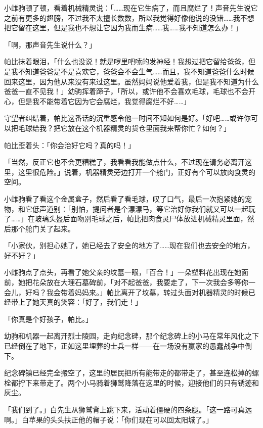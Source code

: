 小雌驹顿了顿，看着机械精灵说：「……现在它生病了，而且腐烂了！声音先生说它之前有更多的翅膀，不过我不太擅长数数，所以我觉得好像他说的没错……我不想把它留在这里，但是我也不想让它因为我而生病……我……我不知道怎么办！」

「啊，那声音先生说什么？」

帕比抹着眼泪，「什么也没说！就是啰里吧嗦的发神经！我想过把它留给爸爸，但是我不知道爸爸是不是喜欢它，爸爸会不会生气……而且，我不知道爸爸什么时候回来这里，因为他从来没有来过这里。虽然妈妈说他爱着我，但是我不知道为什么爸爸一直不见我！」幼驹挥着蹄子，「所以，或许他不会喜欢毛球，毛球也不会开心，但是我不能带着它因为它会腐烂，我觉得腐烂不好……」

守望者纠结着，帕比这番话的沉重感令他一时间不知如何是好。「好吧……或许你可以把毛球给我？把它放在这个机器精灵的货仓里面我来帮你忙？如何？」

帕比歪着头：「你会治好它吗？真的吗！」

「当然，反正它也不会更糟糕了，我看看我能做点什么，不过现在请务必离开这里，这里很危险。」说着，机器精灵旁边打开一个舱门，正好有个可以放肉食灵的空间。

小雌驹看了看这个金属盒子，然后看了看毛球，叹了口气，最后一次抱紧她的宠物，和它低声道别：「别怕，提问者是个漂漂马，等它治好你我们就又可以一起玩了……」在玻璃头盔后面吻别毛球之后，帕比把肉食灵尸体放进机械精灵里面，然后那个舱门关了起来。

「小家伙，别担心她了，她已经去了安全的地方了……现在我们也去安全的地方，好不好？」

小雌驹点了点头，再看了她父亲的坟墓一眼，「百合！」一朵塑料花出现在她面前，她把花朵放在大理石墓碑前，「对不起爸爸，我要走了，下一次我会多等你一会儿，好吗？我会带着妈妈来。」帕比离开了坟墓，转过头面对机器精灵的时候已经带上了她天真的笑容：「好了，我们走！」

「你真是个好孩子，帕比。」

幼驹和机器一起离开烈士陵园，走向纪念碑，那个纪念碑上的小马在常年风化之下已经倒在了地下，正如这里埋葬的士兵一样——在一场没有赢家的愚蠢战争中倒下。

\horizonline


纪念碑镇已经完全搬空了，这里的居民把所有能带走的都带走了，甚至连松掉的螺栓都拧下来带走了。两个小马骑着狮鹫降落在这里的时候，迎接他们的只有锈迹和灰尘。

「我们到了。」白先生从狮鹫背上跳下来，活动着僵硬的四条腿。「这一路可真远啊。」白苹果的头头扶正他的帽子说：「你们现在可以回太阳城了。」

